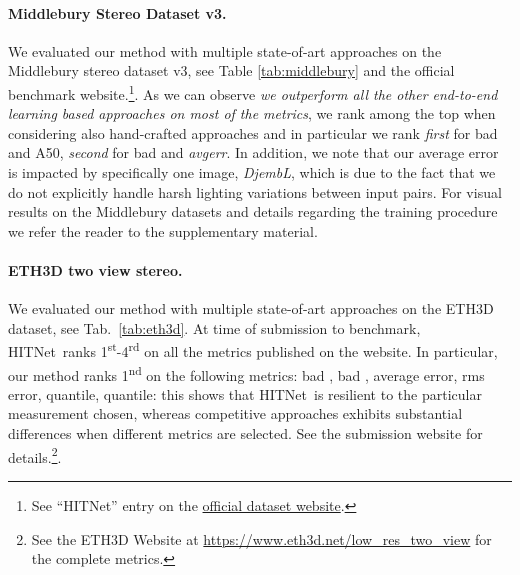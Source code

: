 \documentclass[final]{cvpr}
\newcommand{\algoname}{HITNet}
\begin{document}
\paragraph{Middlebury Stereo Dataset v3.} We evaluated our method with multiple state-of-art approaches on the Middlebury stereo dataset v3, see Table \ref{tab:middlebury} and the official benchmark website.\footnote{See ``HITNet'' entry on the  \href{http://vision.middlebury.edu/stereo/eval3/}{official dataset website}.}. 
As we can observe \textit{we outperform all the other end-to-end learning based approaches on most of the metrics}, we rank among the top  when considering also hand-crafted approaches and in particular we rank \textit{first} for bad  and A50, \textit{second} for bad  and \textit{avgerr}. In addition, we note that our average error is impacted by specifically one image, \textit{DjembL}, which is due to the fact that we do not explicitly handle harsh lighting variations between input pairs. For visual results on the Middlebury datasets and details regarding the training procedure we refer the reader to the supplementary material.

\paragraph{ETH3D two view stereo.} We evaluated our method with multiple state-of-art approaches on the ETH3D dataset, see Tab.~\ref{tab:eth3d}. At time of submission to benchmark, \algoname \ ranks 1\textsuperscript{st}-4\textsuperscript{rd} on all the metrics published on the website. In particular, our method ranks 1\textsuperscript{nd} on the following metrics: bad , bad , average error, rms error,  quantile,  quantile: this shows that \algoname \ is resilient to the particular measurement chosen, whereas competitive approaches exhibits substantial differences when different metrics are selected. See the submission website for details.\footnote{See the ETH3D Website at \href{https://www.eth3d.net/low_res_two_view}{https://www.eth3d.net/low\_res\_two\_view} for the complete metrics.}.
\end{document}
